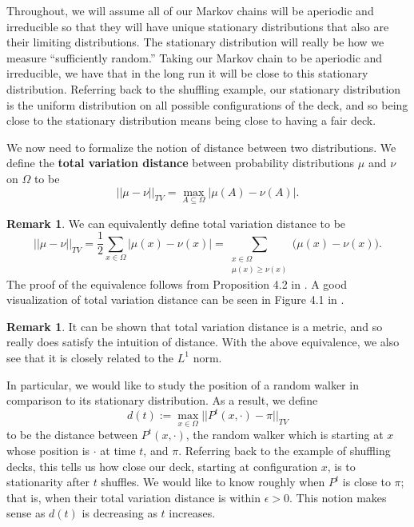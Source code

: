 \documentclass[10pt,a4paper]{amsart}
\theoremstyle{definition}
\numberwithin{definition}{section}
\newtheorem{remark}[definition]{Remark}
\begin{document}
Throughout, we will assume all of our Markov chains will be aperiodic and irreducible so that they will have unique stationary distributions that also are their limiting distributions. The stationary distribution will really be how we measure ``sufficiently random.'' Taking our Markov chain to be aperiodic and irreducible, we have that in the long run it will be close to this stationary distribution. Referring back to the shuffling example, our stationary distribution is the uniform distribution on all possible configurations of the deck, and so being close to the stationary distribution means being close to having a fair deck.

We now need to formalize the notion of distance between two distributions. We define the \textbf{total variation distance} between probability distributions $\mu$ and $\nu$ on $\Omega$ to be 
\[ || \mu - \nu ||_{TV} = \max_{A \subseteq \Omega} |\mu(A) - \nu(A)|.\]

\begin{remark}
We can equivalently define total variation distance to be 
\[ ||\mu - \nu ||_{TV} = \frac{1}{2} \sum_{x \in \Omega} \big|\mu(x) - \nu(x)\big| = \sum_{\substack{x \in \Omega \\ \mu(x) \geq \nu(x)}} \big(\mu(x) - \nu(x)\big).\]
The proof of the equivalence follows from Proposition 4.2 in \cite{LevinPeresWilmer2006}. A good visualization of total variation distance can be seen in Figure 4.1 in \cite{LevinPeresWilmer2006}.
\end{remark}

\begin{remark}
It can be shown that total variation distance is a metric, and so really does satisfy the intuition of distance. With the above equivalence, we also see that it is closely related to the $L^1$ norm.
\end{remark}

In particular, we would like to study the position of a random walker in comparison to its stationary distribution. As a result, we define
\[ d(t) := \max_{x \in \Omega} ||P^t(x, \cdot) - \pi ||_{TV}\]
to be the distance between $P^t(x, \cdot)$, the random walker which is starting at $x$ whose position is $\cdot$ at time $t$, and $\pi$. Referring back to the example of shuffling decks, this tells us how close our deck, starting at configuration $x$, is to stationarity after $t$ shuffles. We would like to know roughly when $P^t$ is close to $\pi$; that is, when their total variation distance is within $\epsilon >0$. This notion makes sense as $d(t)$ is decreasing as $t$ increases. 
\end{document}
